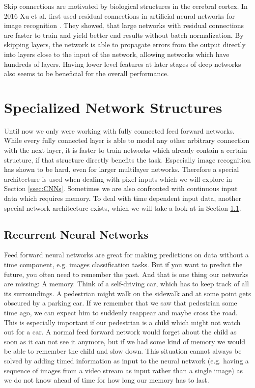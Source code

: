 \begin{enumerate}
  Skip connections are motivated by biological structures in the cerebral cortex. In 2016 Xu et al. first used residual connections in artificial neural networks for image recognition \cite{he2016deep}. They showed, that large networks with residual connections are faster to train and yield better end results without batch normalization. By skipping layers, the network is able to propagate errors from the output directly into layers close to the input of the network, allowing networks which have hundreds of layers. Having lower level features at later stages of deep networks also seems to be beneficial for the overall performance.
\end{enumerate}

\section{Specialized Network Structures} \label{sec:SpecializedNetworks}
Until now we only were working with fully connected feed forward networks. While every fully connected layer is able to model any other arbitrary connection with the next layer, it is faster to train networks which already contain a certain structure, if that structure directly benefits the task. Especially image recognition has shown to be hard, even for larger multilayer networks. Therefore a special architecture is used when dealing with pixel inputs which we will explore in Section \ref{ssec:CNNs}. Sometimes we are also confronted with continuous input data which requires memory. To deal with time dependent input data, another special network architecture exists, which we will take a look at in Section \ref{ssec:RNNs}. 

\subsection{Recurrent Neural Networks} \label{ssec:RNNs}
Feed forward neural networks are great for making predictions on data without a time component, e.g. images classification tasks. But if you want to predict the future, you often need to remember the past. And that is one thing our networks are missing: A memory. Think of a self-driving car, which has to keep track of all its surroundings. A pedestrian might walk on the sidewalk and at some point gets obscured by a parking car. If we remember that we saw that pedestrian some time ago, we can expect him to suddenly reappear and maybe cross the road. This is especially important if our pedestrian is a child which might not watch out for a car. A normal feed forward network would forget about the child as soon as it can not see it anymore, but if we had some kind of memory we would be able to remember the child and slow down. This situation cannot always be solved by adding timed information as input to the neural network (e.g. having a sequence of images from a video stream as input rather than a single image) as we do not know ahead of time for how long our memory has to last. 

